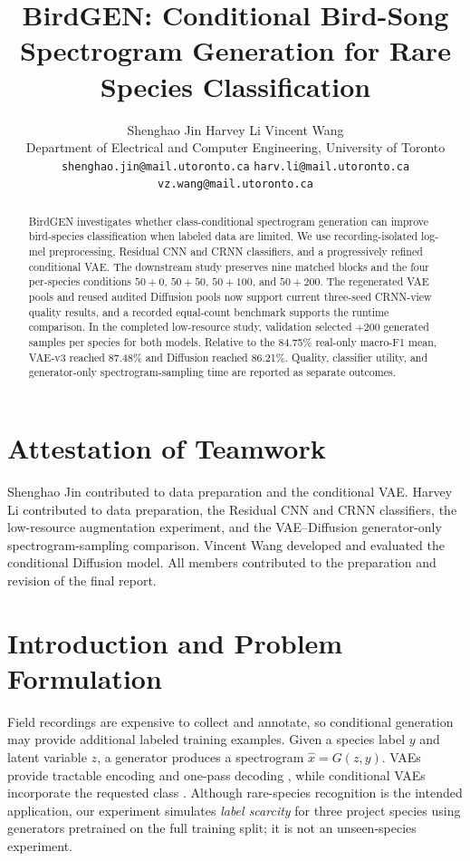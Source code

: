 \documentclass{article}
\title{BirdGEN: Conditional Bird-Song Spectrogram Generation for Rare Species Classification}
\author{%
  Shenghao Jin \quad Harvey Li \quad Vincent Wang\\
  Department of Electrical and Computer Engineering, University of Toronto\\
  {\small\texttt{shenghao.jin@mail.utoronto.ca} \quad
  \texttt{harv.li@mail.utoronto.ca}}\\
  {\small\texttt{vz.wang@mail.utoronto.ca}}
}
\begin{document}
\maketitle

\begin{abstract}
BirdGEN investigates whether class-conditional spectrogram generation can
improve bird-species classification when labeled data are limited.  We use
recording-isolated log-mel preprocessing, Residual CNN and CRNN classifiers,
and a progressively refined conditional VAE.  The downstream study preserves
nine matched blocks and the four per-species conditions $50+0$, $50+50$,
$50+100$, and $50+200$. The regenerated VAE pools and reused audited Diffusion
pools now support current three-seed CRNN-view quality results, and a recorded
equal-count benchmark supports the runtime comparison. In the completed
low-resource study, validation selected $+200$ generated samples per species
for both models. Relative to the 84.75\% real-only macro-F1 mean, VAE-v3 reached
87.48\% and Diffusion reached 86.21\%. Quality, classifier utility, and
generator-only spectrogram-sampling time are reported as separate outcomes.
\end{abstract}

\section*{Attestation of Teamwork}
Shenghao Jin contributed to data preparation and the conditional VAE. Harvey
Li contributed to data preparation, the Residual CNN and CRNN classifiers,
the low-resource augmentation experiment, and the VAE--Diffusion
generator-only spectrogram-sampling comparison. Vincent Wang developed and evaluated the conditional Diffusion
model. All members contributed to the preparation and revision of the final
report.

\section{Introduction and Problem Formulation}

Field recordings are expensive to collect and annotate, so conditional
generation may provide additional labeled training examples.  Given a species
label $y$ and latent variable $z$, a generator produces a spectrogram
$\hat{x}=G(z,y)$. VAEs provide tractable encoding and one-pass decoding
\cite{kingma2014aevb}, while conditional VAEs incorporate the requested class
\cite{sohn2015cvae}. Although rare-species recognition is the intended
application, our experiment simulates \emph{label scarcity} for three project
species using generators pretrained on the full training split; it is not an
unseen-species experiment.
\end{document}
